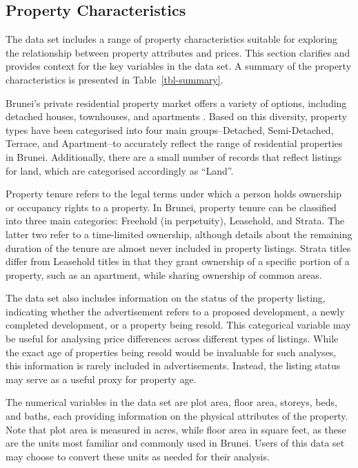\documentclass[
  number]{elsarticle}
\begin{document}
\subsection{Property Characteristics}\label{property-characteristics}

The data set includes a range of property characteristics suitable for
exploring the relationship between property attributes and prices. This
section clarifies and provides context for the key variables in the data
set. A summary of the property characteristics is presented in
Table~\ref{tbl-summary}.

Brunei's private residential property market offers a variety of
options, including detached houses, townhouses, and apartments
\citep{hassan2023sociocultural}. Based on this diversity, property types
have been categorised into four main groups--Detached, Semi-Detached,
Terrace, and Apartment--to accurately reflect the range of residential
properties in Brunei. Additionally, there are a small number of records
that reflect listings for land, which are categorised accordingly as
``Land''.

Property tenure refers to the legal terms under which a person holds
ownership or occupancy rights to a property. In Brunei, property tenure
can be classified into three main categories: Freehold (in perpetuity),
Leasehold, and Strata. The latter two refer to a time-limited ownership,
although details about the remaining duration of the tenure are almost
never included in property listings. Strata titles differ from Leasehold
titles in that they grant ownership of a specific portion of a property,
such as an apartment, while sharing ownership of common areas.

The data set also includes information on the status of the property
listing, indicating whether the advertisement refers to a proposed
development, a newly completed development, or a property being resold.
This categorical variable may be useful for analysing price differences
across different types of listings. While the exact age of properties
being resold would be invaluable for such analyses, this information is
rarely included in advertisements. Instead, the listing status may serve
as a useful proxy for property age.

The numerical variables in the data set are plot area, floor area,
storeys, beds, and baths, each providing information on the physical
attributes of the property. Note that plot area is measured in acres,
while floor area in square feet, as these are the units most familiar
and commonly used in Brunei. Users of this data set may choose to
convert these units as needed for their analysis.
\end{document}
